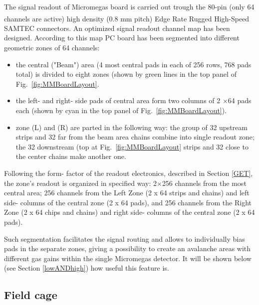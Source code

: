 \documentclass[final,number,sort&compress,5p,times,twocolumn]{elsarticle}
\begin{document}
The signal readout of Micromegas board is carried out trough the 80-pin (only 64 channels are active) high density (0.8 mm pitch) Edge
 Rate\textsuperscript{\textregistered} Rugged High-Speed  {SAMTEC} connectors. An optimized signal readout channel map has been designed. According to this map PC board has been segmented into different geometric zones of 64 channels:
\begin{itemize}
  \item the central ("Beam") area (4 most central pads in each of 256 rows, 768 pads total) is divided to eight zones (shown by green lines in the top panel of Fig.~\ref{fig:MMBoardLayout}.
  \item the left- and right- side pads of central area form two columns of 2 $\times$64 pads each (shown by cyan in the top panel of Fig.~\ref{fig:MMBoardLayout}).
  \item zone (L) and (R) are parted in the following way:  the group of 32 upstream strips and 32 far from the beam area chains combine into single readout zone; the 32 downstream (top at  Fig.~\ref{fig:MMBoardLayout} strips and 32 close to the center chains make another one.
  \end{itemize}

Following the form- factor of the readout electronics, described in Section \ref{GET}, the zone's readout is organized in specified way: 2$\times$256 channels from the most central  area;  256 channels from the Left Zone (2 x 64 strips and chains) and left side- columns of the central zone (2 x 64 pads), and 256 channels from the Right Zone (2 x 64 chips and chains) and right side- columns of the central zone (2 x 64 pads).

Such segmentation facilitates the signal routing and allows to individually bias pads in the separate zones, giving a possibility to create an avalanche areas with different gas gains within the single Micromegas detector. It will be shown below (see Section \ref{lowANDhigh}) how useful this feature is.

\subsection{Field cage \label{FieldCage}}
\end{document}
